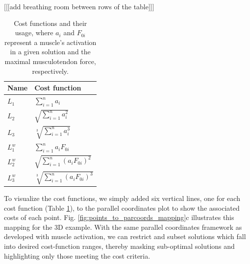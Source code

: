 [[[add breathing room between rows of the table]]]
\begin{table}[h]
\centering
\begin{tabular}{@{}ll@{}}
\toprule
\textbf{Name} & \textbf{Cost function}  \\ \midrule
$L_1$            & $\sum_{i=1}^n a_i$                                     \\
$L_2$            & $\sqrt{\sum_{i=1}^n a_i^2}$                                    \\
$L_3$            & $\sqrt[3]{\sum_{i=1}^n a_i^3}$                                   \\
$L_1^w$            & $\sum_{i=1}^n a_i F_{0i}$                                    \\
$L_2^w$            & $\sqrt{\sum_{i=1}^n (a_i F_{0i})^2}$                                  \\
$L_3^w$            & $\sqrt[3]{\sum_{i=1}^n (a_i F_{0i})^3}$                                    \\ \bottomrule
\end{tabular}
\caption{Cost functions and their usage, where $a_i$ and $F_{0i}$ represent a muscle's activation in a given solution and the maximal musculotendon force, respectively.}
\label{cost_function_tabls}
\end{table}

To visualize the cost functions, we simply added six vertical lines, one for each cost function (Table \ref{cost_function_tabls}), to the parallel coordinates plot to show the associated costs of each point. Fig. \ref{fig:points_to_parcoords_mapping}c illustrates this mapping for the 3D example.
With the same parallel coordinates framework as developed with muscle activation, we can restrict and subset solutions which fall into desired cost-function ranges, thereby masking sub-optimal solutions and highlighting only those meeting the cost criteria.




